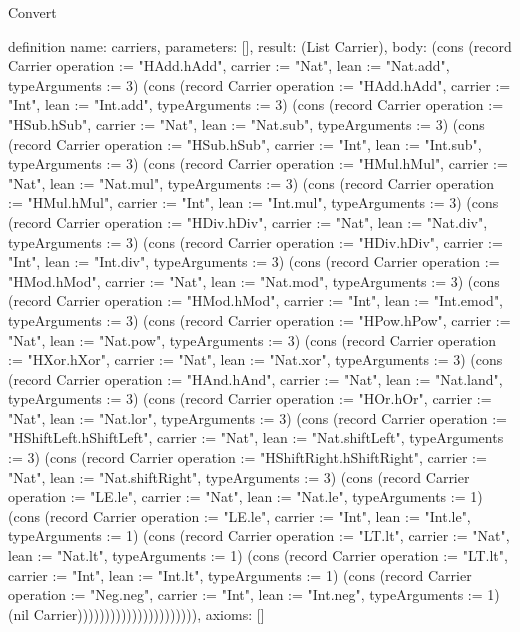 \begin{lexlean}{Convert}
\begin{semanticmodule}
definition{
  name: carriers,
  parameters: [],
  result: (List Carrier),
  body: (cons (record Carrier {operation := "HAdd.hAdd", carrier := "Nat", lean := "Nat.add", typeArguments := 3}) (cons (record Carrier {operation := "HAdd.hAdd", carrier := "Int", lean := "Int.add", typeArguments := 3}) (cons (record Carrier {operation := "HSub.hSub", carrier := "Nat", lean := "Nat.sub", typeArguments := 3}) (cons (record Carrier {operation := "HSub.hSub", carrier := "Int", lean := "Int.sub", typeArguments := 3}) (cons (record Carrier {operation := "HMul.hMul", carrier := "Nat", lean := "Nat.mul", typeArguments := 3}) (cons (record Carrier {operation := "HMul.hMul", carrier := "Int", lean := "Int.mul", typeArguments := 3}) (cons (record Carrier {operation := "HDiv.hDiv", carrier := "Nat", lean := "Nat.div", typeArguments := 3}) (cons (record Carrier {operation := "HDiv.hDiv", carrier := "Int", lean := "Int.div", typeArguments := 3}) (cons (record Carrier {operation := "HMod.hMod", carrier := "Nat", lean := "Nat.mod", typeArguments := 3}) (cons (record Carrier {operation := "HMod.hMod", carrier := "Int", lean := "Int.emod", typeArguments := 3}) (cons (record Carrier {operation := "HPow.hPow", carrier := "Nat", lean := "Nat.pow", typeArguments := 3}) (cons (record Carrier {operation := "HXor.hXor", carrier := "Nat", lean := "Nat.xor", typeArguments := 3}) (cons (record Carrier {operation := "HAnd.hAnd", carrier := "Nat", lean := "Nat.land", typeArguments := 3}) (cons (record Carrier {operation := "HOr.hOr", carrier := "Nat", lean := "Nat.lor", typeArguments := 3}) (cons (record Carrier {operation := "HShiftLeft.hShiftLeft", carrier := "Nat", lean := "Nat.shiftLeft", typeArguments := 3}) (cons (record Carrier {operation := "HShiftRight.hShiftRight", carrier := "Nat", lean := "Nat.shiftRight", typeArguments := 3}) (cons (record Carrier {operation := "LE.le", carrier := "Nat", lean := "Nat.le", typeArguments := 1}) (cons (record Carrier {operation := "LE.le", carrier := "Int", lean := "Int.le", typeArguments := 1}) (cons (record Carrier {operation := "LT.lt", carrier := "Nat", lean := "Nat.lt", typeArguments := 1}) (cons (record Carrier {operation := "LT.lt", carrier := "Int", lean := "Int.lt", typeArguments := 1}) (cons (record Carrier {operation := "Neg.neg", carrier := "Int", lean := "Int.neg", typeArguments := 1}) (nil Carrier)))))))))))))))))))))),
  axioms: []
}


\end{semanticmodule}
\end{lexlean}
